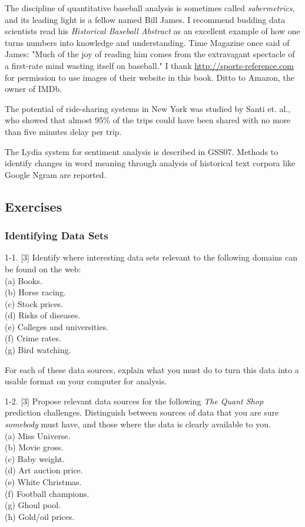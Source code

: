 \documentclass[10pt]{article}
\begin{document}
The discipline of quantitative baseball analysis is sometimes called \emph{sabermetrics}, and its leading light is a fellow named Bill James. I recommend budding data scientists read his \emph{Historical Baseball Abstract} as an excellent example of how one turns numbers into knowledge and understanding. Time Magazine once said of James: "Much of the joy of reading him comes from the extravagant spectacle of a first-rate mind wasting itself on baseball." I thank \href{http://sports-reference.com}{http://sports-reference.com} for permission to use images of their website in this book. Ditto to Amazon, the owner of IMDb.

The potential of ride-sharing systems in New York was studied by Santi et. al., who showed that almost 95\% of the trips could have been shared with no more than five minutes delay per trip.

The Lydia system for sentiment analysis is described in GSS07. Methods to identify changes in word meaning through analysis of historical text corpora like Google Ngram are reported.

\subsection{Exercises}
\subsubsection{Identifying Data Sets}
1-1. [3] Identify where interesting data sets relevant to the following domains can be found on the web:\\
(a) Books.\\
(b) Horse racing.\\
(c) Stock prices.\\
(d) Risks of diseases.\\
(e) Colleges and universities.\\
(f) Crime rates.\\
(g) Bird watching.

For each of these data sources, explain what you must do to turn this data into a usable format on your computer for analysis.

1-2. [3] Propose relevant data sources for the following \emph{The Quant Shop} prediction challenges. Distinguish between sources of data that you are sure \emph{somebody} must have, and those where the data is clearly available to you.\\
(a) Miss Universe.\\
(b) Movie gross.\\
(c) Baby weight.\\
(d) Art auction price.\\
(e) White Christmas.\\
(f) Football champions.\\
(g) Ghoul pool.\\
(h) Gold/oil prices.
\end{document}
